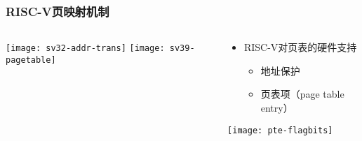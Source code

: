 \begin{frame}   
	\frametitle{RISC-V页映射机制}
	
	\begin{columns}
		
		\begin{column}{.5\textwidth}
			\centering
			\texttt{[image: sv32-addr-trans]}
			\texttt{[image: sv39-pagetable]}
			
		\end{column}
		
		
		\begin{column}{.5\textwidth}
			
			\begin{itemize}\large
				\item RISC-V对页表的硬件支持
				\begin{itemize}
					\item 地址保护
					\item 页表项（page table entry）
					
					
				\end{itemize}
			\end{itemize}
			\texttt{[image: pte-flagbits]}
		\end{column}
		
		
	\end{columns}
	
\end{frame}


